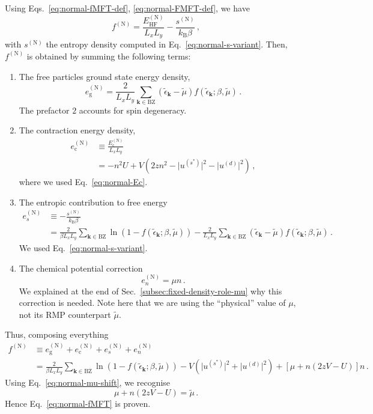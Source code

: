 \begin{tabproof}
	
	Using Eqs.~\eqref{eq:normal-fMFT-def}, \eqref{eq:normal-FMFT-def}, we have
	\[
		f^{(\mathrm{N})} = \frac{E_\mathrm{HF}^{(\mathrm{N})}}{L_x L_y} - \frac{s^{(\mathrm{N})}}{k_\mathrm{B} \beta} \, ,
	\]
	with $s^{(\mathrm{N})}$ the entropy density computed in Eq.~\eqref{eq:normal-s-variant}. Then, $f^{(\mathrm{N})}$ is obtained by summing the following terms:
	\begin{enumerate}
		\item The free particles ground state energy density,
		\[
			e_\mathrm{g}^{(\mathrm{N})} = \frac{2}{L_x L_y} \sum_{\mathbf{k}\in\mathrm{BZ}} (\tilde{\epsilon}_\mathbf{k}-\tilde{\mu}) f( \tilde{\epsilon}_\mathbf{k}; \beta,\tilde{\mu} ) \, .
		\]
		The prefactor $2$ accounts for spin degeneracy.
		\item The contraction energy density,
		\[
		\begin{aligned}
			e_\mathrm{c}^{(\mathrm{N})} &\equiv \frac{E_\mathrm{c}^{(\mathrm{N})}}{L_x L_y} \\
			&= - n^2 U + V \left(
				2zn^2 - 
				\big|
					u^{(s^*)}
				\big|^2 - \big|
					u^{(d)}
				\big|^2
			\right) \, ,
		\end{aligned}
		\]
		where we used Eq.~\eqref{eq:normal-Ec}.
		\item The entropic contribution to free energy
		\[
		\begin{aligned}
			e_s^{(\mathrm{N})} &\equiv -\frac{s^{(\mathrm{N})}}{k_\mathrm{B} \beta} \\
			&= \frac{2}{\beta L_x L_y} \sum_{\mathbf{k}\in\mathrm{BZ}} \ln \left(
			1- f( \tilde{\epsilon}_\mathbf{k}; \beta,\tilde{\mu}) \right) - \frac{2}{L_x L_y} \sum_{\mathbf{k}\in\mathrm{BZ}} (\tilde{\epsilon}_\mathbf{k}-\tilde{\mu}) f( \tilde{\epsilon}_\mathbf{k}; \beta,\tilde{\mu}) \, .
		\end{aligned}
		\]
		We used Eq.~\eqref{eq:normal-s-variant}.
		\item The chemical potential correction
		\[
			e_n^{(\mathrm{N})} = \mu n \, .
		\]
		We explained at the end of Sec.~\ref{subsec:fixed-density-role-mu} why this correction is needed. 	Note here that we are using the ``physical'' value of $\mu$, not its RMP counterpart $\tilde{\mu}$.
	\end{enumerate}
	Thus, composing everything
	\[
	\begin{aligned}
		f^{(\mathrm{N})} &\equiv e_\mathrm{g}^{(\mathrm{N})} + e_\mathrm{c}^{(\mathrm{N})} + e_s^{(\mathrm{N})} + e_n^{(\mathrm{N})} \nonumber \\
		&= \frac{2}{\beta L_x L_y} \sum_{\mathbf{k}\in\mathrm{BZ}} \ln \left(
		1- f( \tilde{\epsilon}_\mathbf{k}; \beta,\tilde{\mu}) \right) - V \left( 
			\big|
				u^{(s^*)}
			\big|^2 + \big|
				u^{(d)}
			\big|^2
		\right) + \left[
			\mu + n(2zV-U)
		\right] n \, .
	\end{aligned}
	\]
	Using Eq.~\eqref{eq:normal-mu-shift}, we recognise
	\[
		\mu + n(2zV-U) = \tilde{\mu} \, .
	\]
	Hence Eq.~\eqref{eq:normal-fMFT} is proven.
	
\end{tabproof}

